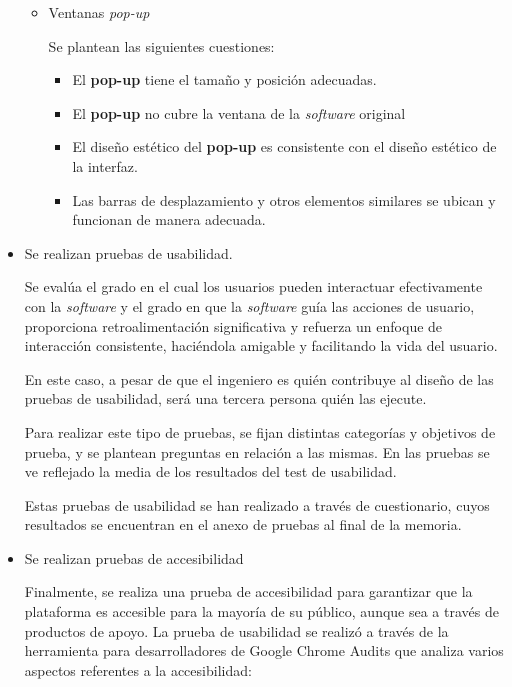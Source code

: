 \begin{itemize}
\begin{itemize}
\item Ventanas \textit{pop-up}


Se plantean las siguientes cuestiones:



\begin{itemize}

\item El \textbf{pop-up} tiene el tamaño y posición adecuadas. 
\item El \textbf{pop-up} no cubre la ventana de la \textit{software} original 
\item El diseño estético del \textbf{pop-up} es consistente con el diseño estético de la interfaz. 
\item Las barras de desplazamiento y otros elementos similares se ubican y funcionan de manera adecuada.
\end{itemize}
\end{itemize}
\item Se realizan pruebas de usabilidad.


Se evalúa el grado en el cual los usuarios pueden interactuar efectivamente con la \textit{software} y el grado en que la \textit{software} guía las acciones de usuario, proporciona retroalimentación significativa y refuerza un enfoque de interacción consistente, haciéndola amigable y facilitando la vida del usuario.


En este caso, a pesar de que el ingeniero es quién contribuye al diseño de las pruebas de usabilidad, será una tercera persona quién las ejecute.


Para realizar este tipo de pruebas, se fijan distintas categorías y objetivos de prueba, y se plantean preguntas en relación a las mismas. En las pruebas se ve reflejado la media de los resultados del test de usabilidad.

Estas pruebas de usabilidad se han realizado a través de cuestionario, cuyos resultados se encuentran en el anexo de pruebas al final de la memoria.

\item Se realizan pruebas de accesibilidad


Finalmente, se realiza una prueba de accesibilidad para garantizar que la plataforma es accesible para la mayoría de su público, aunque sea a través de productos de apoyo. La prueba de usabilidad se realizó a través de la herramienta para desarrolladores de Google Chrome Audits que analiza varios aspectos referentes a la accesibilidad:


\end{itemize}
